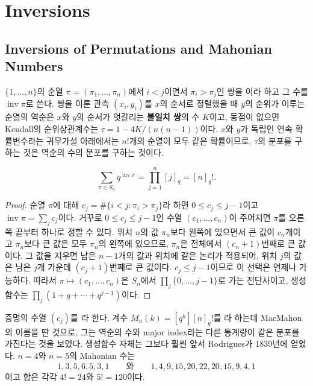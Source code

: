 \section{Inversions}
\label{sec:inversions}

\subsection{Inversions of Permutations and Mahonian Numbers}

$\{1,\dots,n\}$의 순열 $\pi=(\pi_1,\dots,\pi_n)$에서 $i<j$이면서 $\pi_i>\pi_j$인 쌍을 이라 하고 그 수를 $\operatorname{inv}\pi$로 쓴다. 쌍을 이룬 관측 $(x_i,y_i)$를 $x$의 순서로 정렬했을 때 $y$의 순위가 이루는 순열의 역순은 $x$와 $y$의 순서가 엇갈리는 \textbf{불일치 쌍}의 수 $K$이고, 동점이 없으면 Kendall의 순위상관계수는 $\tau=1-4K/(n(n-1))$이다\cite{kendall1938}. $x$와 $y$가 독립인 연속 확률변수라는 귀무가설 아래에서는 $n!$개의 순열이 모두 같은 확률이므로, $\tau$의 분포를 구하는 것은 역순의 수의 분포를 구하는 것이다.

\begin{theorem}
\label{thm:mahonian}
\[
\sum_{\pi\in S_n}q^{\operatorname{inv}\pi}=\prod_{j=1}^n[j]_q=[n]_q!.
\]
\end{theorem}

\begin{proof}
순열 $\pi$에 대해 $c_j=\#\{i<j:\pi_i>\pi_j\}$라 하면 $0\le c_j\le j-1$이고 $\operatorname{inv}\pi=\sum_jc_j$이다. 거꾸로 $0\le c_j\le j-1$인 수열 $(c_1,\dots,c_n)$이 주어지면 $\pi$를 오른쪽 끝부터 하나로 정할 수 있다. 위치 $n$의 값 $\pi_n$보다 왼쪽에 있으면서 큰 값이 $c_n$개이고 $\pi_n$보다 큰 값은 모두 $\pi_n$의 왼쪽에 있으므로, $\pi_n$은 전체에서 $(c_n+1)$번째로 큰 값이다. 그 값을 지우면 남은 $n-1$개의 값과 위치에 같은 논리가 적용되어, 위치 $j$의 값은 남은 $j$개 가운데 $(c_j+1)$번째로 큰 값이다. $c_j\le j-1$이므로 이 선택은 언제나 가능하다. 따라서 $\pi\mapsto(c_1,\dots,c_n)$은 $S_n$에서 $\prod_j\{0,\dots,j-1\}$로 가는 전단사이고, 생성함수는 $\prod_j(1+q+\cdots+q^{j-1})$이다.
\end{proof}

증명의 수열 $(c_j)$를 라 한다. 계수 $M_n(k)=[q^k][n]_q!$를 라 하는데 MacMahon의 이름을 딴 것으로, 그는 역순의 수와 major index라는 다른 통계량이 같은 분포를 가진다는 것을 보였다\cite{macmahon1915}. 생성함수 자체는 그보다 훨씬 앞서 Rodrigues가 1839년에 얻었다\cite{knuth1998taocp3}. $n=4$와 $n=5$의 Mahonian 수는
\[
1,3,5,6,5,3,1\qquad\text{와}\qquad1,4,9,15,20,22,20,15,9,4,1
\]
이고 합은 각각 $4!=24$와 $5!=120$이다.

